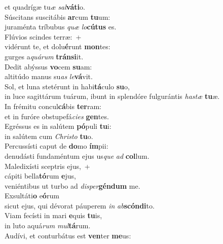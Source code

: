 \oddverse et quadrígæ tu\textit{æ} \textit{sal}\textbf{vá}\textbf{ti}o.\\
\evenverse Súscitans suscitábis \textbf{ar}cum \textbf{tu}um:~\*\\
\evenverse juraménta tríbubus \textit{quæ} \textit{lo}\textbf{cú}\textbf{tus} es.\\
\oddverse Flúvios scindes terræ:~+\\
\oddverse  vidérunt te, et dolu\textbf{é}runt \textbf{mon}tes:~\*\\
\oddverse gurges a\textit{quá}\textit{rum} \textbf{trán}\textbf{si}it.\\
\evenverse Dedit abýssus \textbf{vo}cem \textbf{su}am:~\*\\
\evenverse altitúdo manus su\textit{as} \textit{le}\textbf{vá}vit.\\
\oddverse Sol, et luna stetérunt in habi\textbf{tá}culo \textbf{su}o,~\*\\
\oddverse in luce sagittárum tuárum, ibunt in splendóre fulgurántis \textit{ha}\textit{stæ} \textbf{tu}æ.\\
\evenverse In frémitu concul\textbf{cá}bis \textbf{ter}ram:~\*\\
\evenverse et in furóre obstupefá\textit{ci}\textit{es} \textbf{gen}tes.\\
\oddverse Egréssus es in salútem \textbf{pó}puli \textbf{tu}i:~\*\\
\oddverse in salútem cum \textit{Chri}\textit{sto} \textbf{tu}o.\\
\evenverse Percussísti caput de \textbf{do}mo \textbf{ím}pii:~\*\\
\evenverse denudásti fundaméntum ejus us\textit{que} \textit{ad} \textbf{col}lum.\\
\oddverse Maledixísti sceptris ejus,~+\\
\oddverse  cápiti bella\textbf{tó}rum \textbf{e}jus,~\*\\
\oddverse veniéntibus ut turbo ad \textit{di}\textit{sper}\textbf{gén}\textbf{dum} me.\\
\evenverse Exsultáti\textbf{o} e\textbf{ó}rum~\*\\
\evenverse sicut ejus, qui dévorat páuperem \textit{in} \textit{ab}\textbf{scón}\textbf{di}to.\\
\oddverse Viam fecísti in mari \textbf{e}quis \textbf{tu}is,~\*\\
\oddverse in luto aquá\textit{rum} \textit{mul}\textbf{tá}rum.\\
\evenverse Audívi, et conturbátus est \textbf{ven}ter \textbf{me}us:~\*\\
